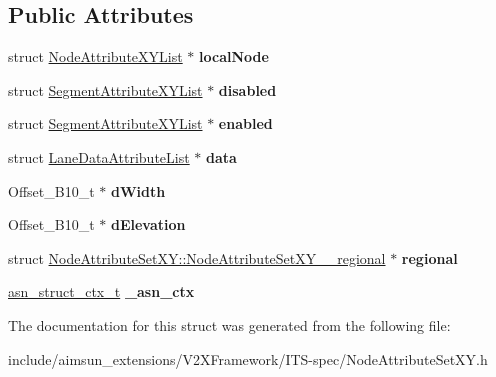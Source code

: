 \subsection*{Public Attributes}
\begin{DoxyCompactItemize}
\item 
struct \hyperlink{structNodeAttributeXYList}{Node\+Attribute\+X\+Y\+List} $\ast$ {\bfseries local\+Node}\hypertarget{structNodeAttributeSetXY_ae640a4c9dfed002924da566daeb39e63}{}\label{structNodeAttributeSetXY_ae640a4c9dfed002924da566daeb39e63}

\item 
struct \hyperlink{structSegmentAttributeXYList}{Segment\+Attribute\+X\+Y\+List} $\ast$ {\bfseries disabled}\hypertarget{structNodeAttributeSetXY_a7436be1a0a19cc4e539a07f201126c36}{}\label{structNodeAttributeSetXY_a7436be1a0a19cc4e539a07f201126c36}

\item 
struct \hyperlink{structSegmentAttributeXYList}{Segment\+Attribute\+X\+Y\+List} $\ast$ {\bfseries enabled}\hypertarget{structNodeAttributeSetXY_a61fe8dd136f8c9b3b155aca8e7e6aae6}{}\label{structNodeAttributeSetXY_a61fe8dd136f8c9b3b155aca8e7e6aae6}

\item 
struct \hyperlink{structLaneDataAttributeList}{Lane\+Data\+Attribute\+List} $\ast$ {\bfseries data}\hypertarget{structNodeAttributeSetXY_a97a902a38aaad802574845518feb4b80}{}\label{structNodeAttributeSetXY_a97a902a38aaad802574845518feb4b80}

\item 
Offset\+\_\+\+B10\+\_\+t $\ast$ {\bfseries d\+Width}\hypertarget{structNodeAttributeSetXY_a9f33a6bdcfd37b546d57f4dcbca665f8}{}\label{structNodeAttributeSetXY_a9f33a6bdcfd37b546d57f4dcbca665f8}

\item 
Offset\+\_\+\+B10\+\_\+t $\ast$ {\bfseries d\+Elevation}\hypertarget{structNodeAttributeSetXY_a182dde36c5fe2c986f7dd8324ac7164d}{}\label{structNodeAttributeSetXY_a182dde36c5fe2c986f7dd8324ac7164d}

\item 
struct \hyperlink{structNodeAttributeSetXY_1_1NodeAttributeSetXY____regional}{Node\+Attribute\+Set\+X\+Y\+::\+Node\+Attribute\+Set\+X\+Y\+\_\+\+\_\+regional} $\ast$ {\bfseries regional}\hypertarget{structNodeAttributeSetXY_a19f1870b2a91fecbc095a8704455cf3b}{}\label{structNodeAttributeSetXY_a19f1870b2a91fecbc095a8704455cf3b}

\item 
\hyperlink{structasn__struct__ctx__s}{asn\+\_\+struct\+\_\+ctx\+\_\+t} {\bfseries \+\_\+asn\+\_\+ctx}\hypertarget{structNodeAttributeSetXY_a6f94fa99f827152c4e36f5ff78f6485f}{}\label{structNodeAttributeSetXY_a6f94fa99f827152c4e36f5ff78f6485f}

\end{DoxyCompactItemize}


The documentation for this struct was generated from the following file\+:\begin{DoxyCompactItemize}
\item 
include/aimsun\+\_\+extensions/\+V2\+X\+Framework/\+I\+T\+S-\/spec/Node\+Attribute\+Set\+X\+Y.\+h\end{DoxyCompactItemize}
